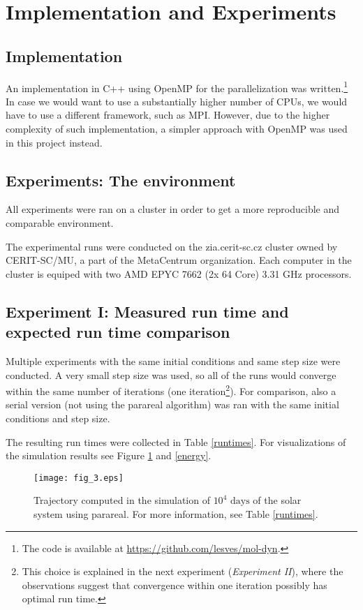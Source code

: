 \documentclass[conference]{IEEEtran}
\begin{document}
\section{Implementation and Experiments}

\subsection{Implementation}
An implementation in C++ using OpenMP for the parallelization was written.\footnote{The code is available at \url{https://github.com/lesves/mol-dyn}.} In case we would want to use a substantially higher number of CPUs, we would have to use a different framework, such as MPI. However, due to the higher complexity of such implementation, a simpler approach with OpenMP was used in this project instead.

\subsection{Experiments: The environment}
All experiments were ran on a cluster in order to get a more reproducible and comparable environment. 

The experimental runs were conducted on the zia.cerit-sc.cz cluster owned by CERIT-SC/MU, a part of the MetaCentrum organization. Each computer in the cluster is equiped with two AMD EPYC 7662 (2x 64 Core) 3.31 GHz processors.

\subsection{Experiment I: Measured run time and expected run time comparison}

Multiple experiments with the same initial conditions and same step size were conducted. A very small step size was used, so all of the runs would converge within the same number of iterations (one iteration\footnote{This choice is explained in the next experiment (\textit{Experiment II}), where the observations suggest that convergence within one iteration possibly has optimal run time.}). For comparison, also a serial version (not using the parareal algorithm) was ran with the same initial conditions and step size.

The resulting run times were collected in Table \ref{runtimes}. For visualizations of the simulation results see Figure \ref{sim} and \ref{energy}.

\begin{figure}[htbp]
\centerline{\texttt{[image: fig\_3.eps]}}
\caption{Trajectory computed in the simulation of $10^4\text{ days}$ of the solar system using parareal. For more information, see Table \ref{runtimes}.}
\label{sim}
\end{figure}
\end{document}
